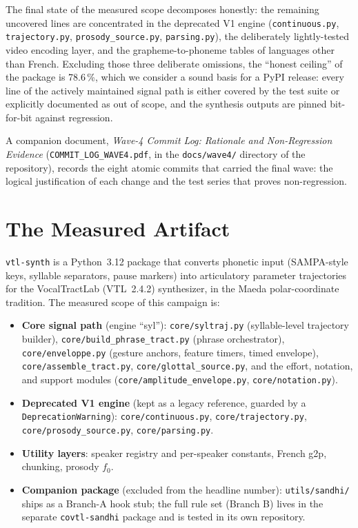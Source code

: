 \documentclass[11pt,a4paper]{article}
\newcommand{\code}[1]{\texttt{#1}}
\newcommand{\pkg}[1]{\texttt{#1}}
\newcommand{\pct}[1]{{#1}\,\%}
\begin{document}
The final state of the measured scope decomposes honestly: the
remaining uncovered lines are concentrated in the deprecated V1 engine
(\code{continuous.py}, \code{trajectory.py}, \code{prosody\_source.py},
\code{parsing.py}), the deliberately
lightly-tested video encoding layer, and the grapheme-to-phoneme tables
of languages other than French. Excluding those three
deliberate omissions, the ``honest ceiling'' of the package is
\pct{78.6}, which we consider a sound basis for a PyPI release: every
line of the actively maintained signal path is either covered by the
test suite or explicitly documented as out of scope, and the synthesis
outputs are pinned bit-for-bit against regression.

A companion document, \emph{Wave-4 Commit Log: Rationale and
Non-Regression Evidence} (\code{COMMIT\_LOG\_WAVE4.pdf}, in the
\code{docs/wave4/} directory of the repository), records the eight
atomic commits that carried the final wave: the logical justification
of each change and the test series that proves non-regression.

\section{The Measured Artifact}
\label{sec:artifact}

\pkg{vtl-synth} is a Python~3.12 package that converts phonetic input
(SAMPA-style keys, syllable separators, pause markers) into
articulatory parameter trajectories for the VocalTractLab (VTL~2.4.2)
synthesizer, in the Maeda polar-coordinate tradition. The measured
scope of this campaign is:

\begin{itemize}[leftmargin=1.4em, itemsep=0.15em]
  \item \textbf{Core signal path} (engine ``syl''):
        \code{core/syltraj.py} (syllable-level trajectory
        builder), \code{core/build\_phrase\_tract.py} (phrase
        orchestrator), \code{core/enveloppe.py} (gesture
        anchors, feature timers, timed envelope),
        \code{core/assemble\_tract.py},
        \code{core/glottal\_source.py}, and the effort,
        notation, and support modules
        (\code{core/amplitude\_envelope.py},
        \code{core/notation.py}).
  \item \textbf{Deprecated V1 engine} (kept as a legacy reference,
        guarded by a \code{DeprecationWarning}):
        \code{core/continuous.py}, \code{core/trajectory.py},
        \code{core/prosody\_source.py}, \code{core/parsing.py}.
  \item \textbf{Utility layers}: speaker registry and per-speaker
        constants, French g2p, chunking, prosody $f_0$.
  \item \textbf{Companion package} (excluded from the headline number):
        \code{utils/sandhi/} ships as a Branch-A hook stub; the full
        rule set (Branch B) lives in the separate
        \pkg{covtl-sandhi} package and is tested in its own
        repository.
\end{itemize}
\end{document}
